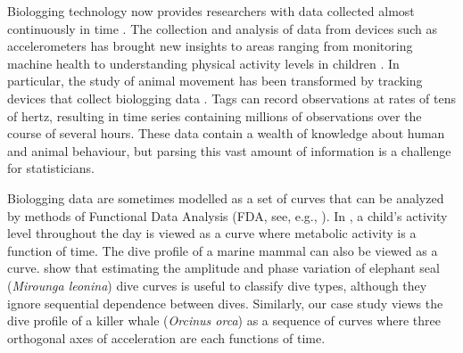 Biologging technology now provides researchers with data collected almost continuously in time \citep{Hooten:2017}.
The collection and analysis of data from devices such as accelerometers has brought new insights to areas ranging from monitoring machine health \citep{Getman:2009} to understanding physical activity levels in children \citep{Morris:2007}. In particular, the study of animal movement has been transformed by tracking devices that collect biologging data \citep{Borger:2020}. Tags can record observations at rates of tens of hertz, resulting in time series containing millions of observations over the course of several hours. These data contain a wealth of knowledge about human and animal behaviour, but parsing this vast amount of information is a challenge for statisticians.


Biologging data are sometimes modelled as a set of curves that can be analyzed by methods of Functional Data Analysis (FDA, see, e.g., \citealt{Ramsay:2005}). In \cite{Morris:2007}, a child's activity level throughout the day is viewed as a curve where metabolic activity is a function of time. The dive profile of a marine mammal can also be viewed as a curve. \citet{Fu:2017} show that estimating the amplitude and phase variation of elephant seal (\textit{Mirounga leonina}) dive curves is useful to classify dive types, although they ignore sequential dependence between dives. 
Similarly, our case study views the dive profile of a killer whale (\textit{Orcinus orca}) as a sequence of curves where three orthogonal axes of acceleration are each functions of time.

